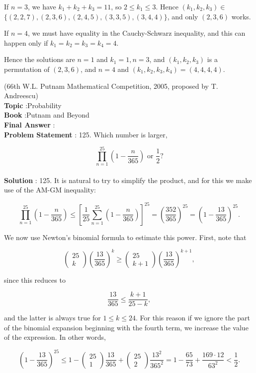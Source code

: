 \documentclass[10pt]{article}
\begin{document}
If $n=3$, we have $k_{1}+k_{2}+k_{3}=11$, so $2 \leq k_{1} \leq 3$. Hence $\left(k_{1}, k_{2}, k_{3}\right) \in$ $\{(2,2,7),(2,3,6),(2,4,5),(3,3,5),(3,4,4)\}$, and only $(2,3,6)$ works.

If $n=4$, we must have equality in the Cauchy-Schwarz inequality, and this can happen only if $k_{1}=k_{2}=k_{3}=k_{4}=4$.

Hence the solutions are $n=1$ and $k_{1}=1, n=3$, and $\left(k_{1}, k_{2}, k_{3}\right)$ is a permutation of $(2,3,6)$, and $n=4$ and $\left(k_{1}, k_{2}, k_{3}, k_{4}\right)=(4,4,4,4)$.

(66th W.L. Putnam Mathematical Competition, 2005, proposed by T. Andreescu)
\\
\textbf{Topic} :Probability\\
\textbf{Book} :Putnam and Beyond\\
\textbf{Final Answer} :\\


\textbf{Problem Statement} :
125. Which number is larger,

$$
\prod_{n=1}^{25}\left(1-\frac{n}{365}\right) \text { or } \frac{1}{2} ?
$$
\\
\textbf{Solution} :
125. It is natural to try to simplify the product, and for this we make use of the AM-GM inequality:

$$
\prod_{n=1}^{25}\left(1-\frac{n}{365}\right) \leq\left[\frac{1}{25} \sum_{n=1}^{25}\left(1-\frac{n}{365}\right)\right]^{25}=\left(\frac{352}{365}\right)^{25}=\left(1-\frac{13}{365}\right)^{25} .
$$

We now use Newton's binomial formula to estimate this power. First, note that

$$
\left(\begin{array}{c}
25 \\
k
\end{array}\right)\left(\frac{13}{365}\right)^{k} \geq\left(\begin{array}{c}
25 \\
k+1
\end{array}\right)\left(\frac{13}{365}\right)^{k+1},
$$

since this reduces to

$$
\frac{13}{365} \leq \frac{k+1}{25-k},
$$

and the latter is always true for $1 \leq k \leq 24$. For this reason if we ignore the part of the binomial expansion beginning with the fourth term, we increase the value of the expression. In other words,

$$
\left(1-\frac{13}{365}\right)^{25} \leq 1-\left(\begin{array}{c}
25 \\
1
\end{array}\right) \frac{13}{365}+\left(\begin{array}{c}
25 \\
2
\end{array}\right) \frac{13^{2}}{365^{2}}=1-\frac{65}{73}+\frac{169 \cdot 12}{63^{2}}<\frac{1}{2} .
$$
\end{document}
